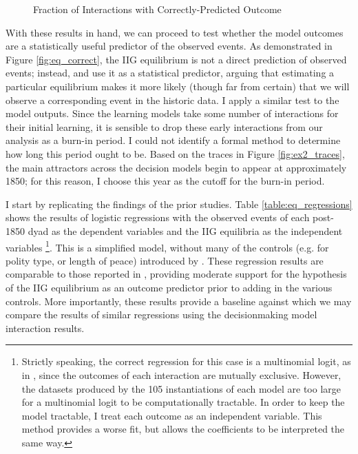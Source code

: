 \begin{landscape}
\begin{figure}[h!]
	    \caption{Fraction of Interactions with Correctly-Predicted Outcome}
	    \label{fig:ex2_correct}
	    \figSpace
	\end{figure}

\end{landscape}

With these results in hand, we can proceed to test whether the model outcomes are a statistically useful predictor of the observed events. As demonstrated in Figure \ref{fig:eq_correct}, the IIG equilibrium is not a direct prediction of observed events; instead, \citet{bdm_1992} and \citet{bennett_2000} use it as a statistical predictor, arguing that estimating a particular equilibrium makes it more likely (though far from certain) that we will observe a corresponding event in the historic data. I apply a similar test to the model outputs. Since the learning models take some number of interactions for their initial learning, it is sensible to drop these early interactions from our analysis as a burn-in period. I could not identify a formal method to determine how long this period ought to be. Based on the traces in Figure \ref{fig:ex2_traces}, the main attractors across the decision models begin to appear at approximately 1850; for this reason, I choose this year as the cutoff for the burn-in period.

I start by replicating the findings of the prior studies. Table \ref{table:eq_regressions} shows the results of logistic regressions with the observed events of each post-1850 dyad as the dependent variables and the IIG equilibria as the independent variables \footnote{Strictly speaking, the correct regression for this case is a multinomial logit, as in \citet{bennett_2000}, since the outcomes of each interaction are mutually exclusive. However, the datasets produced by the 105 instantiations of each model are too large for a multinomial logit to be computationally tractable. In order to keep the model tractable, I treat each outcome as an independent variable. This method provides a worse fit, but allows the coefficients to be interpreted the same way.}. This is a simplified model, without many of the controls (e.g. for polity type, or length of peace) introduced by \citet{bennett_2000}. These regression results are comparable to those reported in \citet{bennett_2000}, providing moderate support for the hypothesis of the IIG equilibrium as an outcome predictor prior to adding in the various controls. More importantly, these results provide a baseline against which we may compare the results of similar regressions using the decisionmaking model interaction results.

